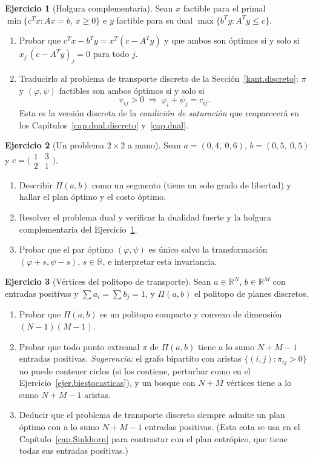 \documentclass[12pt, a4paper]{amsbook}
\newcommand{\R}{{\mathbb R}}
\theoremstyle{remark}
\theoremstyle{definition}
\newtheorem{ejercicio}{Ejercicio}[chapter]
\numberwithin{section}{chapter}
\numberwithin{subsection}{section}
\numberwithin{equation}{section}
\numberwithin{figure}{chapter}
\begin{document}
\begin{ejercicio}[Holgura complementaria]\label{ejer.PL.holgura}
Sean $x$ factible para el primal $\min\{c^Tx:Ax=b,\,x\ge0\}$ e $y$ factible
para su dual $\max\{b^Ty:A^Ty\le c\}$.
\begin{enumerate}[label=(\alph*)]
\item Probar que $c^Tx-b^Ty=x^T(c-A^Ty)$ y que ambos son óptimos si y solo
si $x_j\,(c-A^Ty)_j=0$ para todo $j$.
\item Traducirlo al problema de transporte discreto de la
Sección~\ref{kant.discreto}: $\pi$ y $(\varphi,\psi)$ factibles son ambos
óptimos si y solo si
\[
\pi_{ij}>0\ \Longrightarrow\ \varphi_i+\psi_j=c_{ij}.
\]
Esta es la versión discreta de la \emph{condición de saturación} que
reaparecerá en los Capítulos~\ref{cap.dual.discreto} y~\ref{cap.dual}.
\end{enumerate}
\end{ejercicio}

\begin{ejercicio}[Un problema $2\times2$ a mano]\label{ejer.PL.2x2}
Sean $a=(0{,}4,\ 0{,}6)$, $b=(0{,}5,\ 0{,}5)$ y
$c=\bigl(\begin{smallmatrix}1&3\\2&1\end{smallmatrix}\bigr)$.
\begin{enumerate}[label=(\alph*)]
\item Describir $\Pi(a,b)$ como un segmento (tiene un solo grado de
libertad) y hallar el plan óptimo y el costo óptimo.
\item Resolver el problema dual y verificar la dualidad fuerte y la holgura
complementaria del Ejercicio~\ref{ejer.PL.holgura}.
\item Probar que el par óptimo $(\varphi,\psi)$ es único salvo la
transformación $(\varphi+s,\psi-s)$, $s\in\R$, e interpretar esta
invariancia.
\end{enumerate}
\end{ejercicio}

\begin{ejercicio}[Vértices del politopo de transporte]\label{ejer.PL.vertices}
Sean $a\in\R^N$, $b\in\R^M$ con entradas positivas y
$\sum a_i=\sum b_j=1$, y $\Pi(a,b)$ el politopo de planes discretos.
\begin{enumerate}[label=(\alph*)]
\item Probar que $\Pi(a,b)$ es un politopo compacto y convexo de dimensión
$(N-1)(M-1)$.
\item Probar que todo punto extremal $\pi$ de $\Pi(a,b)$ tiene a lo sumo
$N+M-1$ entradas positivas. \emph{Sugerencia:} el grafo bipartito con
aristas $\{(i,j):\pi_{ij}>0\}$ no puede contener ciclos (si los contiene,
perturbar como en el Ejercicio~\ref{ejer.biestocasticas}), y un bosque con
$N+M$ vértices tiene a lo sumo $N+M-1$ aristas.
\item Deducir que el problema de transporte discreto siempre admite un plan
óptimo con a lo sumo $N+M-1$ entradas positivas. (Esta cota se usa en el
Capítulo~\ref{cap.Sinkhorn} para contrastar con el plan entrópico, que
tiene todas sus entradas positivas.)
\end{enumerate}
\end{ejercicio}
\end{document}
